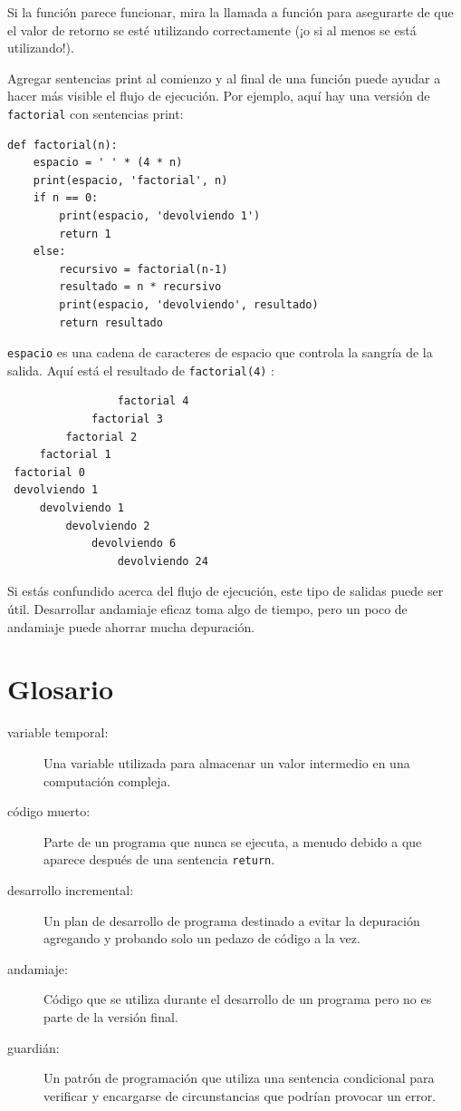 \documentclass[10pt]{book}
\begin{document}
Si la función parece funcionar, mira la llamada a función
para asegurarte de que el valor de retorno se esté utilizando correctamente (¡o si al
menos se está utilizando!).

Agregar sentencias print al comienzo y al final de una función
puede ayudar a hacer más visible el flujo de ejecución.
Por ejemplo, aquí hay una versión de {\tt factorial} con
sentencias print:

\begin{verbatim}
def factorial(n):
    espacio = ' ' * (4 * n)
    print(espacio, 'factorial', n)
    if n == 0:
        print(espacio, 'devolviendo 1')
        return 1
    else:
        recursivo = factorial(n-1)
        resultado = n * recursivo
        print(espacio, 'devolviendo', resultado)
        return resultado
\end{verbatim}
%
{\tt espacio} es una cadena de caracteres de espacio que controla la
sangría de la salida.  Aquí está el resultado de {\tt factorial(4)} :

\begin{verbatim}
                 factorial 4
             factorial 3
         factorial 2
     factorial 1
 factorial 0
 devolviendo 1
     devolviendo 1
         devolviendo 2
             devolviendo 6
                 devolviendo 24
\end{verbatim}
%
Si estás confundido acerca del flujo de ejecución, este tipo de
salidas puede ser útil.  Desarrollar andamiaje eficaz toma algo de
tiempo, pero un poco de andamiaje puede ahorrar mucha depuración.


\section{Glosario}

\begin{description}

\item[variable temporal:]  Una variable utilizada para almacenar un valor intermedio en
una computación compleja.

\item[código muerto:]  Parte de un programa que nunca se ejecuta, a menudo debido a que
aparece después de una sentencia {\tt return}.

\item[desarrollo incremental:]  Un plan de desarrollo de programa destinado a
evitar la depuración agregando y probando solo
un pedazo de código a la vez.

\item[andamiaje:]  Código que se utiliza durante el desarrollo de un programa pero
no es parte de la versión final.

\item[guardián:]  Un patrón de programación que utiliza una sentencia
condicional para verificar y encargarse de circunstancias que
podrían provocar un error.

\end{description}
\end{document}

